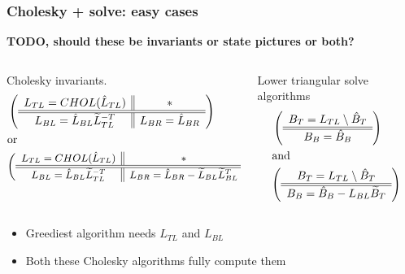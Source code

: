 \documentclass{beamer}
\begin{document}
\begin{frame}
  \frametitle{Cholesky + solve: easy cases}
  \textbf{TODO, should these be invariants or state pictures or both?}

  \begin{columns}
    \begin{column}[t]{0.45\textwidth}
      Cholesky invariants.
      \begin{align*}
        &\left( \begin{array}{c || c} L_{TL} = CHOL(\hat{L}_{TL}) & * \\ \hline \hline L_{BL} = \hat{L}_{BL}\widetilde{L}_{TL}^{-T} & L_{BR} = \hat{L}_{BR} \end{array} \right)\\
        &\text{or}\\
        &{\small \left( \begin{array}{c || c} L_{TL} = CHOL(\hat{L}_{TL}) & * \\ \hline \hline L_{BL} = \hat{L}_{BL}\widetilde{L}_{TL}^{-T} & L_{BR} = \hat{L}_{BR} - \widetilde{L}_{BL}\widetilde{L}_{BL}^T \end{array} \right)}
      \end{align*}
    \end{column}
    \begin{column}[t]{0.55\textwidth}
      Lower triangular solve algorithms
      \begin{align*}
        &\left( \begin{array}{c} B_T = L_{TL} \setminus \hat{B}_T \\ \hline \hline B_B = \hat{B}_B \end{array} \right)\\
        &\text{and}\\
        &{\left( \begin{array}{c} B_T = L_{TL} \setminus \hat{B}_T \\ \hline \hline B_B = \hat{B}_B - L_{BL}\widetilde{B}_T \end{array} \right)}
      \end{align*}
    \end{column}
  \end{columns}

  \begin{itemize}
  \item Greediest algorithm needs $L_{TL}$ and $L_{BL}$
  \item Both these Cholesky algorithms fully compute them
  \end{itemize}
\end{frame}
\end{document}
